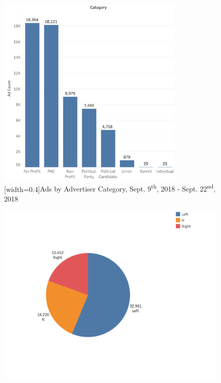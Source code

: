\documentclass[fleqn,10pt]{wlscirep}
\begin{document}
\begin{figure}
    \centering
    
    \begin{minipage}{.5\textwidth}
    \centering
    \includegraphics[width=0.8\textwidth]{ads_by_category.png}
    [width=0.4\textwidth]{Ads by Advertiser Category, Sept. 9\textsuperscript{th}, 2018 - Sept. 22\textsuperscript{nd}, 2018}
    \label{fig:ads_by_category}
\end{minipage}%
\begin{minipage}{.5\textwidth}

    \centering
    \includegraphics[width=1\textwidth]{ads_by_lean.png}
    \label{fig:ads_by_lean}
\end{minipage}
\end{figure}
\end{document}

